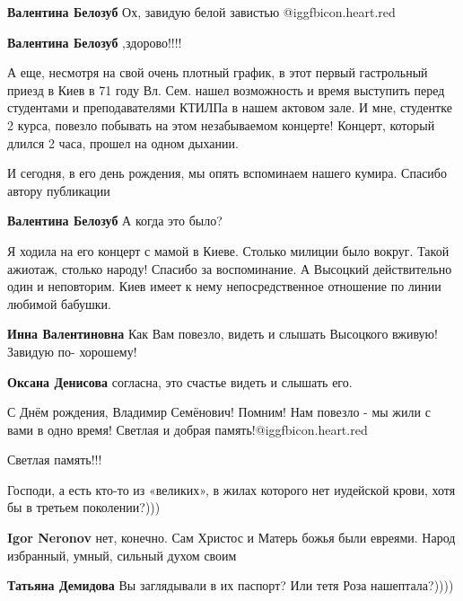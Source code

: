\begin{itemize}
\begin{itemize}
\textbf{Валентина Белозуб} Ох, завидую белой завистью @igg{fbicon.heart.red}

\textbf{Валентина Белозуб} ,здорово!!!!


А еще, несмотря на свой очень плотный график, в этот первый гастрольный приезд
в Киев в 71 году Вл. Сем. нашел возможность и время выступить перед студентами
и преподавателями КТИЛПа в нашем актовом зале. И мне, студентке 2 курса,
повезло побывать на этом незабываемом концерте! Концерт, который длился 2 часа,
прошел на одном дыхании.

И сегодня, в его день рождения, мы опять вспоминаем нашего кумира. Спасибо автору публикации

\textbf{Валентина Белозуб} А когда это было?

\end{itemize} %


Я ходила на его концерт с мамой в Киеве. Столько милиции было вокруг. Такой
ажиотаж, столько народу! Спасибо за воспоминание. А Высоцкий действительно один
и неповторим. Киев имеет к нему непосредственное отношение по линии любимой
бабушки.

\begin{itemize} %
\textbf{Инна Валентиновна} Как Вам повезло, видеть и слышать Высоцкого вживую! Завидую по- хорошему!

\textbf{Оксана Денисова} согласна, это счастье видеть и слышать его.
\end{itemize} %


С Днём рождения, Владимир Семёнович! Помним!
Нам повезло - мы жили с вами в одно время!
Светлая и добрая память!@igg{fbicon.heart.red}

Светлая память!!!

Господи, а есть кто-то из «великих», в жилах которого нет иудейской крови, хотя
бы в третьем поколении?)))

\begin{itemize} %
\textbf{Igor Neronov} нет, конечно. Сам Христос и Матерь божья были евреями. Народ избранный, умный, сильный духом своим

\textbf{Татьяна Демидова} Вы заглядывали в их паспорт? Или тетя Роза нашептала?))))


\end{itemize}
\end{itemize}

